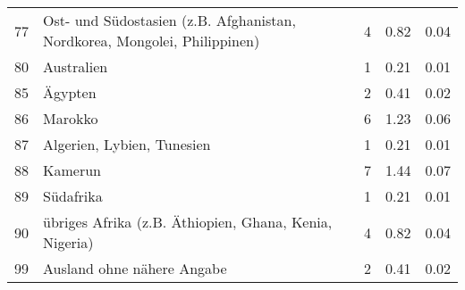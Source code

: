 \begin{longtable}{lXrrr}
        77 & \multicolumn{1}{X}{Ost- und Südostasien (z.B. Afghanistan, Nordkorea, Mongolei, Philippinen)} & %
          \num{4} &
          \num[round-mode=places,round-precision=2]{0,82} &
          \num[round-mode=places,round-precision=2]{0,04} \\

        80 & \multicolumn{1}{X}{Australien} & %
          \num{1} &
          \num[round-mode=places,round-precision=2]{0,21} &
          \num[round-mode=places,round-precision=2]{0,01} \\

        85 & \multicolumn{1}{X}{Ägypten} & %
          \num{2} &
          \num[round-mode=places,round-precision=2]{0,41} &
          \num[round-mode=places,round-precision=2]{0,02} \\

        86 & \multicolumn{1}{X}{Marokko} & %
          \num{6} &
          \num[round-mode=places,round-precision=2]{1,23} &
          \num[round-mode=places,round-precision=2]{0,06} \\

        87 & \multicolumn{1}{X}{Algerien, Lybien, Tunesien} & %
          \num{1} &
          \num[round-mode=places,round-precision=2]{0,21} &
          \num[round-mode=places,round-precision=2]{0,01} \\

        88 & \multicolumn{1}{X}{Kamerun} & %
          \num{7} &
          \num[round-mode=places,round-precision=2]{1,44} &
          \num[round-mode=places,round-precision=2]{0,07} \\

        89 & \multicolumn{1}{X}{Südafrika} & %
          \num{1} &
          \num[round-mode=places,round-precision=2]{0,21} &
          \num[round-mode=places,round-precision=2]{0,01} \\

        90 & \multicolumn{1}{X}{übriges Afrika (z.B. Äthiopien, Ghana, Kenia, Nigeria)} & %
          \num{4} &
          \num[round-mode=places,round-precision=2]{0,82} &
          \num[round-mode=places,round-precision=2]{0,04} \\

        99 & \multicolumn{1}{X}{Ausland ohne nähere Angabe} & %
          \num{2} &
          \num[round-mode=places,round-precision=2]{0,41} &
          \num[round-mode=places,round-precision=2]{0,02} \\


\end{longtable}
